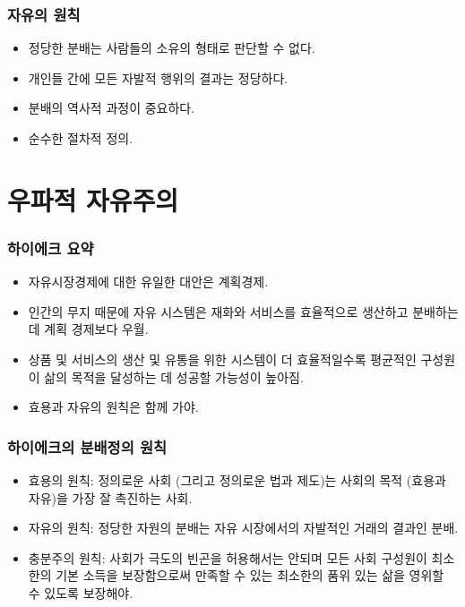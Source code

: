 \documentclass[aspectratio=169,xcolor=dvipsnames,handout]{beamer}
\begin{document}
\begin{frame}[<+->]
\frametitle{자유의 원칙}
    \begin{itemize}
        \item 정당한 분배는 사람들의 소유의 형태로 판단할 수 없다.
        \item 개인들 간에 모든 자발적 행위의 결과는 정당하다.
        \item 분배의 역사적 과정이 중요하다.
        \item 순수한 절차적 정의.
    \end{itemize}
\end{frame}

\section{우파적 자유주의}%

\begin{frame}[<+->]
\frametitle{하이에크 요약}
    \begin{itemize}
        \item 자유시장경제에 대한 유일한 대안은 계획경제.
        \item 인간의 무지 때문에 자유 시스템은 재화와 서비스를 효율적으로 생산하고 분배하는 데 계획 경제보다 우월.
        \item 상품 및 서비스의 생산 및 유통을 위한 시스템이 더 효율적일수록 평균적인 구성원이 삶의 목적을 달성하는 데 성공할 가능성이 높아짐. 
        \item 효용과 자유의 원칙은 함께 가야.
    \end{itemize}
\end{frame}

\begin{frame}[<+->]
\frametitle{하이에크의 분배정의 원칙}
    \begin{itemize}
        \item 효용의 원칙: 정의로운 사회 (그리고 정의로운 법과 제도)는 사회의 목적 (효용과 자유)을 가장 잘 촉진하는 사회.
        \item 자유의 원칙: 정당한 자원의 분배는 자유 시장에서의 자발적인 거래의 결과인 분배.
        \item 충분주의 원칙: 사회가 극도의 빈곤을 허용해서는 안되며 모든 사회 구성원이 최소한의 기본 소득을 보장함으로써 만족할 수 있는 최소한의 품위 있는 삶을 영위할 수 있도록 보장해야.
    \end{itemize}
\end{frame}
\end{document}
